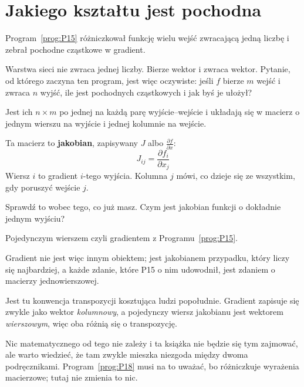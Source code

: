 \section{Jakiego kształtu jest pochodna}
\label{sec:P16-jacobian}

\begin{fr}
Program~\ref{prog:P15} różniczkował funkcję wielu wejść zwracającą jedną
liczbę i zebrał pochodne cząstkowe w gradient.

Warstwa sieci nie zwraca jednej liczby. Bierze wektor i zwraca wektor. Pytanie,
od którego zaczyna ten program, jest więc oczywiste: jeśli $f$ bierze $m$ wejść
i zwraca $n$ wyjść, ile jest pochodnych cząstkowych i jak byś je ułożył?
\dotline
\nextframe
\end{fr}

\begin{fr}
\begin{ansblock}
Jest ich $n \times m$ \dash{} po jednej na każdą parę wyjście--wejście
\dash{} i układają się w macierz o jednym wierszu na wyjście i jednej kolumnie
na wejście.
\end{ansblock}

Ta macierz to \textbf{jakobian}, zapisywany $J$ albo
$\frac{\partial f}{\partial x}$:
\[ J_{ij} = \frac{\partial f_i}{\partial x_j} \]
Wiersz $i$ to gradient $i$-tego wyjścia. Kolumna $j$ mówi, co dzieje się ze
wszystkim, gdy poruszyć wejście $j$.

\end{fr}

\begin{fr}
Sprawdź to wobec tego, co już masz. Czym jest jakobian funkcji o dokładnie
jednym wyjściu?
\nextframe
\end{fr}

\begin{fr}
\begin{ansblock}
Pojedynczym wierszem \dash{} czyli gradientem z Programu~\ref{prog:P15}.
\end{ansblock}

Gradient nie jest więc innym obiektem; jest jakobianem przypadku, który liczy
się najbardziej, a każde zdanie, które P15 o nim udowodnił, jest zdaniem o
macierzy jednowierszowej.

\begin{note}
Jest tu konwencja transpozycji kosztująca ludzi popołudnie. Gradient zapisuje
się zwykle jako wektor \emph{kolumnowy}, a pojedynczy wiersz jakobianu jest
wektorem \emph{wierszowym}, więc oba różnią się o transpozycję.

Nic matematycznego od tego nie zależy i ta książka nie będzie się tym zajmować,
ale warto wiedzieć, że tam zwykle mieszka niezgoda między dwoma podręcznikami.
Program~\ref{prog:P18} musi na to uważać, bo różniczkuje wyrażenia macierzowe;
tutaj nie zmienia to nic.
\end{note}
\end{fr}

